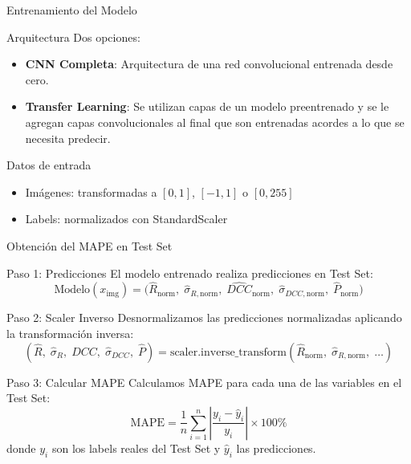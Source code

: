 \documentclass[aspectratio=169, 10pt]{beamer}
\begin{document}
\begin{frame}{Entrenamiento del Modelo}
    \begin{block}{Arquitectura}
        Dos opciones:
        \begin{itemize}
            \item \textbf{CNN Completa}: Arquitectura de una red convolucional entrenada desde cero.
            \item \textbf{Transfer Learning}: Se utilizan capas de un modelo preentrenado y se le agregan capas convolucionales al final que son entrenadas acordes a lo que se necesita predecir. 
        \end{itemize}
    \end{block}
    
    \begin{block}{Datos de entrada}
        \begin{itemize}
            \item Imágenes: transformadas a $[0,1]$, $[-1,1]$ o $[0,255]$
            \item Labels: normalizados con StandardScaler
        \end{itemize}
    \end{block}
    
\end{frame}

\begin{frame}{Obtención del MAPE en Test Set}
    \begin{block}{Paso 1: Predicciones}
        El modelo entrenado realiza predicciones en Test Set:
        $$ \text{Modelo}(x_{\text{img}}) = \bigl(\hat{R}_{\text{norm}},\; \hat{\sigma}_{R,\text{norm}},\; \hat{DCC}_{\text{norm}},\; \hat{\sigma}_{DCC,\text{norm}},\; \hat{P}_{\text{norm}}\bigr) $$
    \end{block}
    
    \begin{block}{Paso 2: Scaler Inverso}
        Desnormalizamos las predicciones normalizadas aplicando la transformación inversa:
        $$(\hat{R},\; \hat{\sigma}_R,\; \hat{DCC},\; \hat{\sigma}_{DCC},\; \hat{P}) = \text{scaler.inverse\_transform}(\hat{R}_{\text{norm}},\; \hat{\sigma}_{R,\text{norm}},\; \ldots)$$
    \end{block}
    
    \begin{exampleblock}{Paso 3: Calcular MAPE}
        Calculamos MAPE para cada una de las variables en el Test Set:
        $$\text{MAPE} = \frac{1}{n}\sum_{i=1}^{n}\left|\frac{y_i - \hat{y}_i}{y_i}\right| \times 100\text{\%}$$
        donde $y_i$ son los labels reales del Test Set y $\hat{y}_i$ las predicciones.
    \end{exampleblock}
\end{frame}
\end{document}

